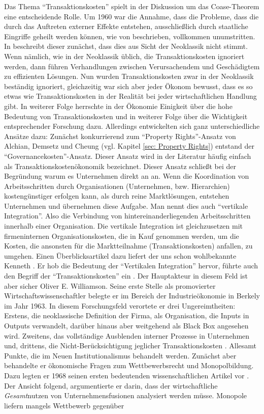Das Thema "`Transaktionskosten"' spielt in der Diskussion um das Coase-Theorem \textcite{Coase1960} eine entscheidende Rolle. Um 1960 war die Annahme, dass die Probleme, dass die durch das Auftreten externer Effekte entstehen, ausschließlich durch staatliche Eingriffe geheilt werden können, wie von \textcite{Pigou1920} beschrieben, vollkommen unumstritten. In \textcite{Coase1960} beschreibt dieser zunächst, dass dies aus Sicht der Neoklassik nicht stimmt. Wenn nämlich, wie in der Neoklassik üblich, die Transaktionskosten ignoriert werden, dann führen Verhandlungen zwischen Verursachendem und Geschädigtem zu effizienten Lösungen. Nun wurden Transaktionskosten zwar in der Neoklassik beständig ignoriert, gleichzeitig war sich aber jeder Ökonom bewusst, dass es so etwas wie Transaktionskosten in der Realität bei jeder wirtschaftlichen Handlung gibt. In weiterer Folge herrschte in der Ökonomie Einigkeit über die hohe Bedeutung von Transaktionskosten und in weiterer Folge über die Wichtigkeit entsprechender Forschung dazu. Allerdings entwickelten sich ganz unterschiedliche Ansätze dazu: Zunächst konkurrierend zum "`Property Rights"'-Ansatz von Alchian, Demsetz und Cheung (vgl. Kapitel \ref{sec: Property Rights}) entstand der "`Governancekosten"'-Ansatz. Dieser Ansatz wird in der Literatur häufig einfach als Transaktionskostenökonomik bezeichnet. Dieser Ansatz schließt bei der Begründung warum es Unternehmen direkt an \textcite{Coase1960} an. Wenn die Koordination von Arbeitsschritten durch Organisationen (Unternehmen, bzw. Hierarchien) kostengünstiger erfolgen kann, als durch reine Marktlösungen, entstehen Unternehmen und übernehmen diese Aufgabe. Man nennt dies auch "`vertikale Integration"'. Also die Verbindung von hintereinanderliegenden Arbeitsschritten innerhalb einer Organisation. Die vertikale Integration ist gleichzusetzen mit firmeninternen Organisationskosten, die in Kauf genommen werden, um die Kosten, die ansonsten für die Marktteilnahme (Transaktionskosten) anfallen, zu umgehen. Einen Überblicksartikel dazu liefert der uns schon wohlbekannte Kenneth \textcite{Arrow1969}. Er hob die Bedeutung der "`Vertikalen Integration"' hervor, führte auch den Begriff der "`Transaktionskosten"' ein \parencite[S. 39]{Erlei2016}. Der Hauptakteur in diesem Feld ist aber sicher Oliver E. Williamson. Seine erste Stelle als promovierter Wirtschaftswissenschaftler belegte er im Bereich der Industrieökonomie in Berkely im Jahr 1963. In diesem Forschungsfeld verortete er drei Ungereimtheiten: Erstens, die neoklassische Definition der Firma, als Organisation, die Inputs in Outputs verwandelt, darüber hinaus aber weitgehend als Black Box angesehen wird. Zweitens, das vollständige Ausblenden interner Prozesse in Unternehmen und, drittens, die Nicht-Berücksichtigung jeglicher Transaktionskosten \parencite{Williamson2009}. Allesamt Punkte, die im Neuen Institutionalismus behandelt werden. Zunächst aber behandelte er ökonomische Fragen zum Wettbewerbsrecht und Monopolbildung. Dazu legten er 1968 seinen ersten bedeutenden wissenschaftlichen Artikel vor \parencite{Williamson1968}. Der Ansicht \textcite{Coase1960, Coase1937} folgend, argumentierte er darin, dass der wirtschaftliche \textit{Gesamt}nutzen von Unternehmensfusionen analysiert werden müsse. Monopole liefern mangels Wettbewerb gegenüber 